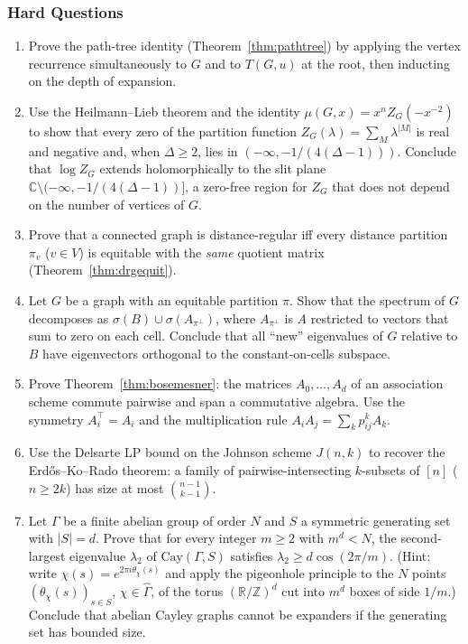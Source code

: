 \subsubsection{Hard Questions}
\begin{enumerate}[resume]
\item Prove the path-tree identity (Theorem~\ref{thm:pathtree}) by
applying the vertex recurrence simultaneously to $G$ and to
$T(G, u)$ at the root, then inducting on the depth of expansion.

\item Use the Heilmann--Lieb theorem and the identity
$\mu(G, x) = x^{n} Z_G(-x^{-2})$ to show that every zero of the partition
function $Z_G(\lambda) = \sum_M \lambda^{|M|}$ is real and negative and,
when $\Delta \ge 2$, lies in $(-\infty, -1/(4(\Delta - 1)))$. Conclude
that $\log Z_G$ extends holomorphically to the slit plane
$\mathbb C \setminus (-\infty, -1/(4(\Delta - 1))]$, a zero-free region
for $Z_G$ that does not depend on the number of vertices of $G$.

\item Prove that a connected graph is distance-regular iff every distance
partition $\pi_v$ ($v \in V$) is equitable with the \emph{same}
quotient matrix (Theorem~\ref{thm:drgequit}).

\item Let $G$ be a graph with an equitable partition $\pi$. Show that the
spectrum of $G$ decomposes as $\sigma(B) \cup \sigma(A_{\pi^\perp})$,
where $A_{\pi^\perp}$ is $A$ restricted to vectors that sum to zero on
each cell. Conclude that all ``new'' eigenvalues of $G$ relative to
$B$ have eigenvectors orthogonal to the constant-on-cells subspace.

\item Prove Theorem~\ref{thm:bosemesner}: the matrices $A_0, \ldots, A_d$
of an association scheme commute pairwise and span a commutative
algebra. Use the symmetry $A_i^\top = A_i$ and the multiplication rule
$A_i A_j = \sum_k p_{ij}^k A_k$.

\item Use the Delsarte LP bound on the Johnson scheme $J(n, k)$ to recover
the Erd\H{o}s--Ko--Rado theorem: a family of pairwise-intersecting
$k$-subsets of $[n]$ ($n \ge 2k$) has size at most $\binom{n-1}{k-1}$.

\item Let $\Gamma$ be a finite abelian group of order $N$ and $S$ a symmetric
generating set with $|S| = d$. Prove that for every integer $m \ge 2$
with $m^{d} < N$, the second-largest eigenvalue $\lambda_2$ of
$\mathrm{Cay}(\Gamma, S)$ satisfies $\lambda_2 \ge d \cos(2\pi/m)$.
(Hint: write $\chi(s) = e^{2\pi i \theta_\chi(s)}$ and apply the
pigeonhole principle to the $N$ points $(\theta_\chi(s))_{s \in S}$,
$\chi \in \widehat{\Gamma}$, of the torus $(\mathbb R/\mathbb Z)^{d}$ cut
into $m^{d}$ boxes of side $1/m$.) Conclude that abelian Cayley graphs
cannot be expanders if the generating set has bounded size.


\end{enumerate}
